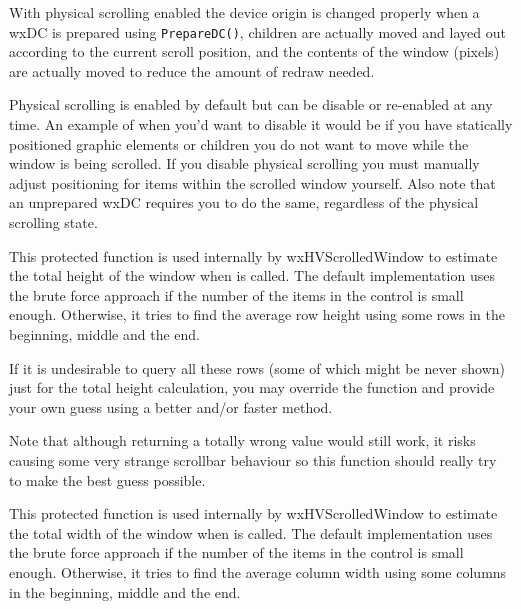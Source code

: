 \label{wxhvscrolledwindowenablephysicalscrolling}


With physical scrolling enabled the device origin is changed properly when a
wxDC is prepared using {\tt PrepareDC()}, children are actually moved and layed
out according to the current scroll position, and the contents of the window
(pixels) are actually moved to reduce the amount of redraw needed.

Physical scrolling is enabled by default but can be disable or re-enabled at
any time.  An example of when you'd want to disable it would be if you have
statically positioned graphic elements or children you do not want to move
while the window is being scrolled.  If you disable physical scrolling you must
manually adjust positioning for items within the scrolled window yourself.
Also note that an unprepared wxDC requires you to do the same, regardless of
the physical scrolling state.


\label{wxhvscrolledwindowestimatetotalheight}


This protected function is used internally by wxHVScrolledWindow to estimate the
total height of the window when 
is called. The default implementation uses the brute force approach if the
number of the items in the control is small enough. Otherwise, it tries to find
the average row height using some rows in the beginning, middle and the end.

If it is undesirable to query all these rows (some of which might be never
shown) just for the total height calculation, you may override the function and
provide your own guess using a better and/or faster method.

Note that although returning a totally wrong value would still work, it risks
causing some very strange scrollbar behaviour so this function should really
try to make the best guess possible.


\label{wxhvscrolledwindowestimatetotalwidth}


This protected function is used internally by wxHVScrolledWindow to estimate the
total width of the window when 
is called. The default implementation uses the brute force approach if the
number of the items in the control is small enough. Otherwise, it tries to find
the average column width using some columns in the beginning, middle and the end.

